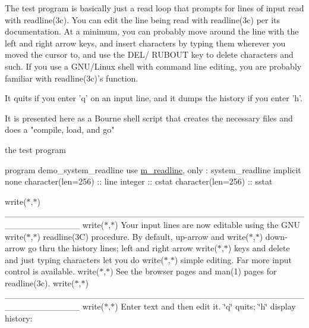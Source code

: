 \begin{DoxyVerb}The test program is basically just a read loop that prompts for
lines of input read with readline(3c). You can edit the line being
read with readline(3c) per its documentation. At a minimum, you can
probably move around the line with the left and right arrow keys, and
insert characters by typing them wherever you moved the cursor to,
and use the DEL/ RUBOUT key to delete characters and such. If you use
a GNU/Linux shell with command line editing, you are probably familiar
with readline(3c)'s function.

It quits if you enter 'q' on an input line, and it dumps the history if
you enter 'h'.

It is presented here as a Bourne shell script that creates the necessary
files and does a "compile, load, and go"
\end{DoxyVerb}


the test program

program demo\+\_\+system\+\_\+readline use \mbox{\hyperlink{namespacem__readline}{m\+\_\+readline}}, only \+: system\+\_\+readline implicit none character(len=256) \+:\+: line integer \+:\+: cstat character(len=256) \+:\+: sstat

write($\ast$,$\ast$)\textquotesingle{} \+\_\+\+\_\+\+\_\+\+\_\+\+\_\+\+\_\+\+\_\+\+\_\+\+\_\+\+\_\+\+\_\+\+\_\+\+\_\+\+\_\+\+\_\+\+\_\+\+\_\+\+\_\+\+\_\+\+\_\+\+\_\+\+\_\+\+\_\+\+\_\+\+\_\+\+\_\+\+\_\+\+\_\+\+\_\+\+\_\+\+\_\+\+\_\+\+\_\+\+\_\+\+\_\+\+\_\+\+\_\+\+\_\+\+\_\+\+\_\+\+\_\+\+\_\+\+\_\+\+\_\+\+\_\+\+\_\+\+\_\+\+\_\+\+\_\+\+\_\+\+\_\+\+\_\+\+\_\+\+\_\+\+\_\+\+\_\+\+\_\+\+\_\+\+\_\+\+\_\+\textquotesingle{} write($\ast$,$\ast$)\textquotesingle{} Your input lines are now editable using the G\+NU\textquotesingle{} write($\ast$,$\ast$)\textquotesingle{} readline(3\+C) procedure. By default, up-\/arrow and\textquotesingle{} write($\ast$,$\ast$)\textquotesingle{} down-\/arrow go thru the history lines; left and right arrow\textquotesingle{} write($\ast$,$\ast$)\textquotesingle{} keys and delete and just typing characters let you do\textquotesingle{} write($\ast$,$\ast$)\textquotesingle{} simple editing. Far more input control is available.\textquotesingle{} write($\ast$,$\ast$)\textquotesingle{} See the browser pages and man(1) pages for readline(3c).\textquotesingle{} write($\ast$,$\ast$)\textquotesingle{} \+\_\+\+\_\+\+\_\+\+\_\+\+\_\+\+\_\+\+\_\+\+\_\+\+\_\+\+\_\+\+\_\+\+\_\+\+\_\+\+\_\+\+\_\+\+\_\+\+\_\+\+\_\+\+\_\+\+\_\+\+\_\+\+\_\+\+\_\+\+\_\+\+\_\+\+\_\+\+\_\+\+\_\+\+\_\+\+\_\+\+\_\+\+\_\+\+\_\+\+\_\+\+\_\+\+\_\+\+\_\+\+\_\+\+\_\+\+\_\+\+\_\+\+\_\+\+\_\+\+\_\+\+\_\+\+\_\+\+\_\+\+\_\+\+\_\+\+\_\+\+\_\+\+\_\+\+\_\+\+\_\+\+\_\+\+\_\+\+\_\+\+\_\+\+\_\+\+\_\+\textquotesingle{} write($\ast$,$\ast$)\textquotesingle{} Enter text and then edit it. \char`\"{}q\char`\"{} quits; \char`\"{}h\char`\"{} display history\+:\textquotesingle{}

